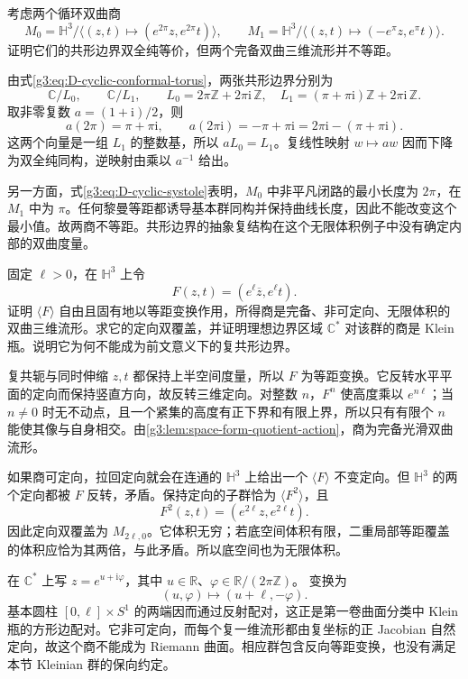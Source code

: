 \begin{exercise}\label{g3:ex:D-same-conformal-boundary-different-interior}
	考虑两个循环双曲商
	\[
		M_0=\mathbb H^3/
		   \langle(z,t)\mapsto(e^{2\pi}z,e^{2\pi}t)\rangle,\qquad
		M_1=\mathbb H^3/
		   \langle(z,t)\mapsto(-e^\pi z,e^\pi t)\rangle.
	\]
	证明它们的共形边界双全纯等价，但两个完备双曲三维流形并不等距。
\end{exercise}
\begin{solution}
	由式\eqref{g3:eq:D-cyclic-conformal-torus}，两张共形边界分别为
	\[
		\mathbb C/L_0,\qquad \mathbb C/L_1,\qquad
		L_0=2\pi\mathbb Z+2\pi\mathrm i\,\mathbb Z,\quad
		L_1=(\pi+\pi\mathrm i)\mathbb Z+2\pi\mathrm i\,\mathbb Z.
	\]
	取非零复数 \(a=(1+\mathrm i)/2\)，则
	\[
		a(2\pi)=\pi+\pi\mathrm i,\qquad
		a(2\pi\mathrm i)=-\pi+\pi\mathrm i
		                  =2\pi\mathrm i-(\pi+\pi\mathrm i).
	\]
	这两个向量是一组 \(L_1\) 的整数基，所以 \(aL_0=L_1\)。复线性映射
	\(w\mapsto aw\) 因而下降为双全纯同构，逆映射由乘以 \(a^{-1}\) 给出。

	另一方面，式\eqref{g3:eq:D-cyclic-systole}表明，\(M_0\) 中非平凡闭路的最小长度为 \(2\pi\)，在 \(M_1\) 中为 \(\pi\)。任何黎曼等距都诱导基本群同构并保持曲线长度，因此不能改变这个最小值。故两商不等距。共形边界的抽象复结构在这个无限体积例子中没有确定内部的双曲度量。
\end{solution}

\begin{exercise}\label{g3:ex:D-reversing-cyclic-quotient}
	固定 \(\ell>0\)，在 \(\mathbb H^3\) 上令
	\[
		F(z,t)=(e^\ell\overline z,e^\ell t).
	\]
	证明 \(\langle F\rangle\) 自由且固有地以等距变换作用，所得商是完备、非可定向、无限体积的双曲三维流形。求它的定向双覆盖，并证明理想边界区域
	\(\mathbb C^*\) 对该群的商是 Klein 瓶。说明它为何不能成为前文意义下的复共形边界。
\end{exercise}
\begin{solution}
	复共轭与同时伸缩 \(z,t\) 都保持上半空间度量，所以 \(F\) 为等距变换。它反转水平平面的定向而保持竖直方向，故反转三维定向。对整数
	\(n\)，\(F^n\) 使高度乘以 \(e^{n\ell}\)；当 \(n\ne0\) 时无不动点，且一个紧集的高度有正下界和有限上界，所以只有有限个 \(n\) 能使其像与自身相交。由\cref{g3:lem:space-form-quotient-action}，商为完备光滑双曲流形。

	如果商可定向，拉回定向就会在连通的 \(\mathbb H^3\) 上给出一个
	\(\langle F\rangle\) 不变定向。但 \(\mathbb H^3\) 的两个定向都被
	\(F\) 反转，矛盾。保持定向的子群恰为 \(\langle F^2\rangle\)，且
	\[
		F^2(z,t)=(e^{2\ell}z,e^{2\ell}t).
	\]
	因此定向双覆盖为 \(M_{2\ell,0}\)。它体积无穷；若底空间体积有限，二重局部等距覆盖的体积应恰为其两倍，与此矛盾。所以底空间也为无限体积。

	在 \(\mathbb C^*\) 上写 \(z=e^{u+\mathrm i\varphi}\)，其中
	\(u\in\mathbb R\)、\(\varphi\in\mathbb R/(2\pi\mathbb Z)\)。
	变换为
	\[
		(u,\varphi)\longmapsto(u+\ell,-\varphi).
	\]
	基本圆柱 \([0,\ell]\times S^1\) 的两端因而通过反射配对，这正是第一卷曲面分类中 Klein 瓶的方形边配对。它非可定向，而每个复一维流形都由复坐标的正 Jacobian 自然定向，故这个商不能成为 Riemann 曲面。相应群包含反向等距变换，也没有满足本节 Kleinian 群的保向约定。
\end{solution}

